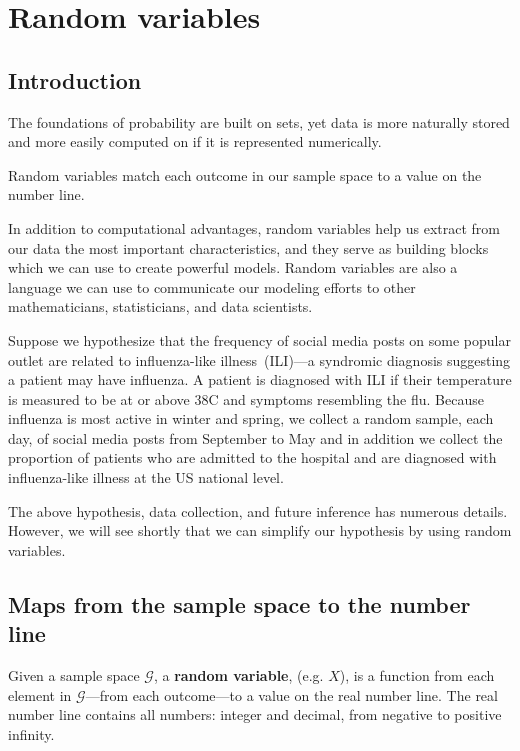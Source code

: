 \chapter{Random variables}
\hspace{1mm}

\section{Introduction}\label{intro}

The foundations of probability are built on sets,
yet data is more naturally stored and more easily computed on if it is represented numerically.  

Random variables match each outcome in our sample space to a value on the number line. 

In addition to computational advantages, random variables help us extract from our data the most important characteristics, and they serve as building blocks which we can use to create powerful models.
Random variables are also a language we can use to communicate our modeling efforts to other mathematicians, statisticians, and data scientists.  

Suppose we hypothesize that the frequency of social media posts on some popular outlet are related to influenza-like illness~(ILI)---a syndromic diagnosis suggesting a patient may have influenza. A patient is diagnosed with ILI if their temperature is measured to be at or above 38C and symptoms resembling the flu.
Because influenza is most active in winter and spring, we collect a random sample, each day, of social media posts from September to May and in addition we collect the proportion of patients who are admitted to the hospital and are diagnosed with influenza-like illness at the US national level. 

The above hypothesis, data collection, and future inference has numerous details. 
However, we will see shortly that we can simplify our hypothesis by using random variables. 

\section{Maps from the sample space to the number line}\label{maps}

Given a sample space $\mathcal{G}$, a \textbf{random variable}, (e.g. $X$), is a function from each element in $\mathcal{G}$---from each outcome---to a value on the real number line.
The real number line contains all numbers: integer and decimal, from negative to positive infinity.

